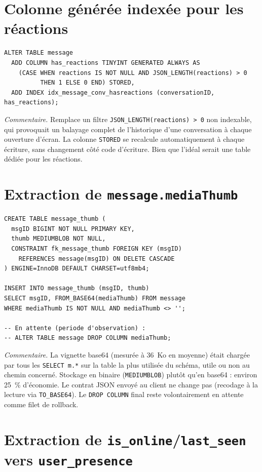 \documentclass[a4paper,11pt]{article}
\begin{document}
\section{Colonne générée indexée pour les réactions}

\begin{lstlisting}
ALTER TABLE message
  ADD COLUMN has_reactions TINYINT GENERATED ALWAYS AS
    (CASE WHEN reactions IS NOT NULL AND JSON_LENGTH(reactions) > 0
          THEN 1 ELSE 0 END) STORED,
  ADD INDEX idx_message_conv_hasreactions (conversationID, has_reactions);
\end{lstlisting}

\noindent\textit{Commentaire.} Remplace un filtre \texttt{JSON\_LENGTH(reactions) > 0} non indexable, qui provoquait un balayage complet de l'historique d'une conversation à chaque ouverture d'écran. La colonne \texttt{STORED} se recalcule automatiquement à chaque écriture, sans changement côté code d'écriture. Bien que l'idéal serait une table dédiée pour les réactions.

\section{Extraction de \texttt{message.mediaThumb}}

\begin{lstlisting}
CREATE TABLE message_thumb (
  msgID BIGINT NOT NULL PRIMARY KEY,
  thumb MEDIUMBLOB NOT NULL,
  CONSTRAINT fk_message_thumb FOREIGN KEY (msgID)
    REFERENCES message(msgID) ON DELETE CASCADE
) ENGINE=InnoDB DEFAULT CHARSET=utf8mb4;

INSERT INTO message_thumb (msgID, thumb)
SELECT msgID, FROM_BASE64(mediaThumb) FROM message
WHERE mediaThumb IS NOT NULL AND mediaThumb <> '';

-- En attente (periode d'observation) :
-- ALTER TABLE message DROP COLUMN mediaThumb;
\end{lstlisting}

\noindent\textit{Commentaire.} La vignette base64 (mesurée à 36~Ko en moyenne) était chargée par tous les \texttt{SELECT m.*} sur la table la plus utilisée du schéma, utile ou non au chemin concerné. Stockage en binaire (\texttt{MEDIUMBLOB}) plutôt qu'en base64 : environ 25~\% d'économie. Le contrat JSON envoyé au client ne change pas (recodage à la lecture via \texttt{TO\_BASE64}). Le \texttt{DROP COLUMN} final reste volontairement en attente comme filet de rollback.

\section{Extraction de \texttt{is\_online}/\texttt{last\_seen} vers \texttt{user\_presence}}
\end{document}
